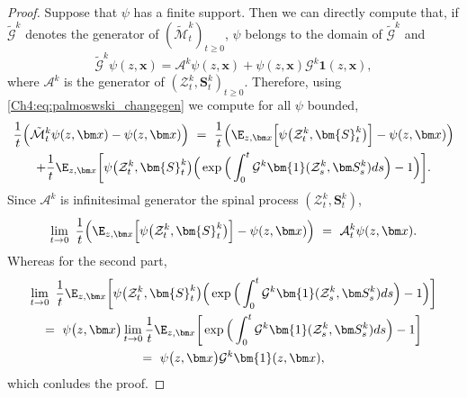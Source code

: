 \begin{refsegment}
\begin{proof}
Suppose that $\psi$ has a finite support. Then we can directly compute that, if $\widetilde{\mathcal{G}}^k$ denotes the generator of $(\widetilde{\mathcal{M}}^k_t)_{t \ge 0}$, $\psi$ belongs to the domain of $\widetilde{\mathcal{G}}^k$ and 
\[
    \widetilde{\mathcal{G}}^k\psi(z, \bm{x}) = \mathcal{A}^k\psi(z, \bm{x}) + \psi(z, \bm{x})\mathcal{G}^k\bm{1}(z, \bm{x}),
\]
where $\mathcal{A}^k$ is the generator of $(\mathcal{Z}^k_t, \bm{S}^k_t)_{t \ge 0}$. Therefore, using \eqref{Ch4:eq:palmoswski_changegen} we compute for all $\psi$ bounded,
\begin{multline*}
\frac{1}{t}\Big(\tilde{\mathcal{M}}^k_t\psi(z,\bm x)-\psi(z,\bm x)\Big)\ =\ \frac{1}{t}\Big(\E_{z,\bm x}\Big[\psi\big(\mathcal{Z}^k_t,\bm{S}^k_t\big)\Big]-\psi(z,\bm x)\Big)\\
+ \frac{1}{t}\E_{z,\bm x}\bigg[\psi\big(\mathcal{Z}^k_t,\bm{S}^k_t\big)\Big(\exp\Big(\int_0^t \mathcal{G}^k\bm{1}(\mathcal{Z}^k_s, \bm S^k_s)ds\Big)-1\Big)\bigg]. 
\end{multline*}
Since $\mathcal{A}^k$ is infinitesimal generator the spinal process $(\mathcal{Z}^k_t,\bm S^k_t)$,  
\[
\lim_{t\to 0}\ \frac{1}{t}\Big(\E_{z,\bm x}\Big[\psi\big(\mathcal{Z}^k_t,\bm{S}^k_t\big)\Big]-\psi(z,\bm x)\Big)\ =\ \mathcal{A}^k_t\psi(z,\bm x).
\]
Whereas for the second part, 
\begin{multline*}
\lim_{t\to 0}\ \frac{1}{t}\E_{z,\bm x}\bigg[\psi\big(\mathcal{Z}^k_t,\bm{S}^k_t\big)\Big(\exp\Big(\int_0^t \mathcal{G}^k\bm{1}(\mathcal{Z}^k_s, \bm S^k_s)ds\Big)-1\Big)\bigg]\\
 =\ \psi\big(z,\bm x\big)\lim_{t\to 0}\frac{1}{t}\E_{z,\bm x}\bigg[\exp\Big(\int_0^t \mathcal{G}^k\bm{1}(\mathcal{Z}^k_s, \bm S^k_s)ds\Big)-1\bigg]\\
  =\ \psi\big(z,\bm x\big)\mathcal{G}^k\bm{1}(z, \bm x),
\end{multline*}
which conludes the proof.
 \end{proof}


\end{refsegment}
